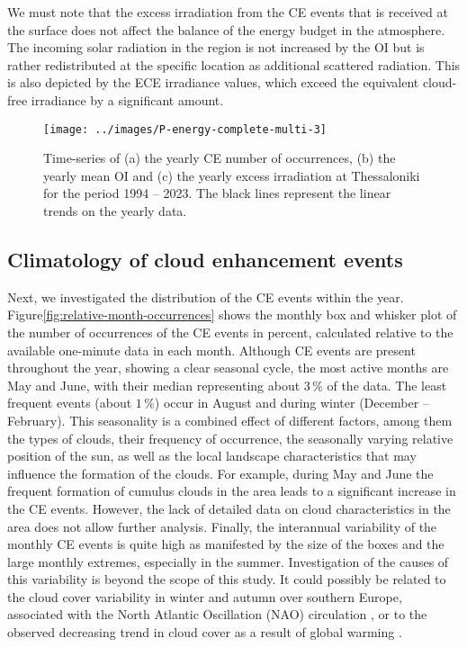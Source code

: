 \documentclass[preprint, 5p,
authoryear]{elsarticle} %
\begin{document}
We must note that the excess irradiation from the CE events that is
received at the surface does not affect the balance of the energy budget
in the atmosphere. The incoming solar radiation in the region is not
increased by the OI but is rather redistributed at the specific location
as additional scattered radiation. This is also depicted by the ECE
irradiance values, which exceed the equivalent cloud-free irradiance by
a significant amount.

\begin{figure}

{\centering \texttt{[image: ../images/P-energy-complete-multi-3]} 

}

\caption{Time-series of (a) the yearly CE number of occurrences, (b) the yearly mean OI and (c) the yearly excess irradiation at Thessaloniki for the period 1994 – 2023. The black lines represent the linear trends on the yearly data.}\label{fig:P-energy}
\end{figure}

\hypertarget{climatology-of-cloud-enhancement-events}{%
\subsection{Climatology of cloud enhancement
events}\label{climatology-of-cloud-enhancement-events}}

Next, we investigated the distribution of the CE events within the year.
Figure\nobreakspace{}\ref{fig:relative-month-occurrences} shows the
monthly box and whisker plot of the number of occurrences of the CE
events in percent, calculated relative to the available one-minute data
in each month. Although CE events are present throughout the year,
showing a clear seasonal cycle, the most active months are May and June,
with their median representing about \(3\,\%\) of the data. The least
frequent events (about \(1\,\%\)) occur in August and during winter
(December -- February). This seasonality is a combined effect of
different factors, among them the types of clouds, their frequency of
occurrence, the seasonally varying relative position of the sun, as well
as the local landscape characteristics that may influence the formation
of the clouds. For example, during May and June the frequent formation
of cumulus clouds in the area leads to a significant increase in the CE
events. However, the lack of detailed data on cloud characteristics in
the area does not allow further analysis. Finally, the interannual
variability of the monthly CE events is quite high as manifested by the
size of the boxes and the large monthly extremes, especially in the
summer. Investigation of the causes of this variability is beyond the
scope of this study. It could possibly be related to the cloud cover
variability in winter and autumn over southern Europe, associated with
the North Atlantic Oscillation (NAO) circulation \citep{Chiacchio2010},
or to the observed decreasing trend in cloud cover as a result of global
warming \citep[e.g.,][]{SanchezLorenzo2017}.
\end{document}
